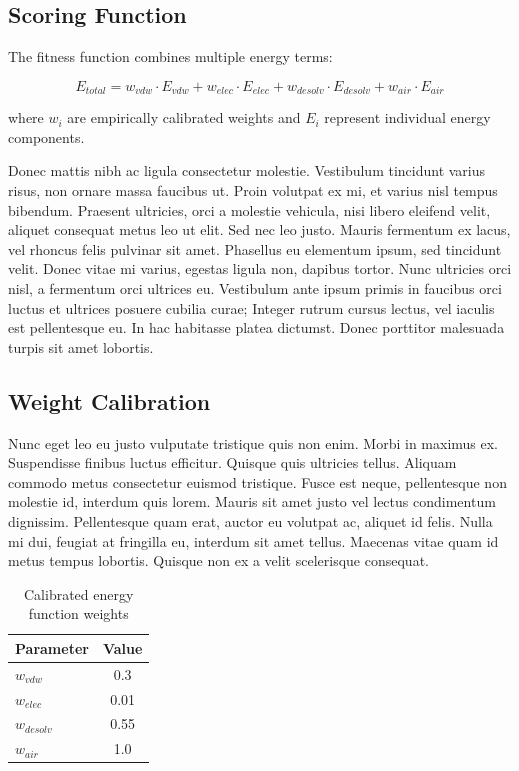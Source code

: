\documentclass[11pt,a4paper]{article}
\begin{document}
\subsection{Scoring Function}

The fitness function combines multiple energy terms:

\begin{equation}
E_{total} = w_{vdw} \cdot E_{vdw} + w_{elec} \cdot E_{elec} + w_{desolv} \cdot E_{desolv} + w_{air} \cdot E_{air}
\end{equation}


where $w_i$ are empirically calibrated weights and $E_i$ represent individual energy components.

Donec mattis nibh ac ligula consectetur molestie. Vestibulum tincidunt varius risus, non ornare massa faucibus ut. Proin volutpat ex mi, et varius nisl tempus bibendum. Praesent ultricies, orci a molestie vehicula, nisi libero eleifend velit, aliquet consequat metus leo ut elit. Sed nec leo justo. Mauris fermentum ex lacus, vel rhoncus felis pulvinar sit amet. Phasellus eu elementum ipsum, sed tincidunt velit. Donec vitae mi varius, egestas ligula non, dapibus tortor. Nunc ultricies orci nisl, a fermentum orci ultrices eu. Vestibulum ante ipsum primis in faucibus orci luctus et ultrices posuere cubilia curae; Integer rutrum cursus lectus, vel iaculis est pellentesque eu. In hac habitasse platea dictumst. Donec porttitor malesuada turpis sit amet lobortis.


\subsection{Weight Calibration}

Nunc eget leo eu justo vulputate tristique quis non enim. Morbi in maximus ex. Suspendisse finibus luctus efficitur. Quisque quis ultricies tellus. Aliquam commodo metus consectetur euismod tristique. Fusce est neque, pellentesque non molestie id, interdum quis lorem. Mauris sit amet justo vel lectus condimentum dignissim. Pellentesque quam erat, auctor eu volutpat ac, aliquet id felis. Nulla mi dui, feugiat at fringilla eu, interdum sit amet tellus. Maecenas vitae quam id metus tempus lobortis. Quisque non ex a velit scelerisque consequat.


\begin{table}[h]
\centering
\caption{Calibrated energy function weights}
\label{tab:weights}
\begin{tabular}{lc}
\toprule
\textbf{Parameter} & \textbf{Value} \\
\midrule
$w_{vdw}$ & 0.3 \\
$w_{elec}$ & 0.01 \\
$w_{desolv}$ & 0.55 \\
$w_{air}$ & 1.0 \\
\bottomrule
\end{tabular}
\end{table}
\end{document}
